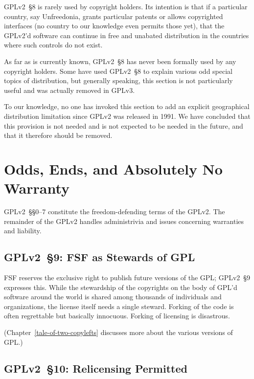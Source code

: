 GPLv2~\S8 is rarely used by copyright holders.  Its intention is that if a
particular country, say Unfreedonia, grants particular patents or allows
copyrighted interfaces (no country to our knowledge even permits those
yet), that the GPLv2'd software can continue in free and unabated
distribution in the countries where such controls do not exist.

As far as is currently known, GPLv2~\S8 has never been formally used by any
copyright holders.  Some have used GPLv2~\S8 to explain various odd special
topics of distribution, but generally speaking, this section is not
particularly useful and was actually removed in GPLv3.


To our knowledge, no one has invoked this section to add an explicit
geographical distribution limitation since GPLv2 was released in 1991. We
have concluded that this provision is not needed and is not expected to be
needed in the future, and that it therefore should be removed.


\chapter{Odds, Ends, and Absolutely No Warranty}

GPLv2~\S\S0--7 constitute the freedom-defending terms of the GPLv2.  The remainder
of the GPLv2 handles administrivia and issues concerning warranties and
liability.

\section{GPLv2~\S9: FSF as Stewards of GPL}
\label{GPLv2s9}

FSF reserves the exclusive right to publish future versions of the GPL\@;
GPLv2~\S9 expresses this.  While the stewardship of the copyrights on the body
of GPL'd software around the world is shared among thousands of
individuals and organizations, the license itself needs a single steward.
Forking of the code is often regrettable but basically innocuous.  Forking
of licensing is disastrous.

(Chapter~\ref{tale-of-two-copylefts} discusses more about the various
versions of GPL.)

\section{GPLv2~\S10: Relicensing Permitted}
\label{GPLv2s10}

